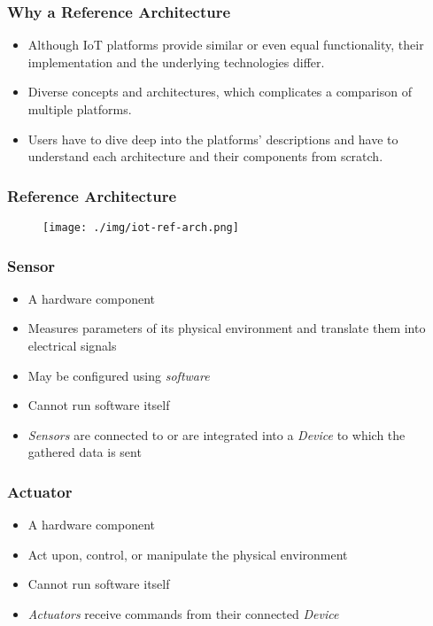 \documentclass{../iot-lecture}
\begin{document}
\begin{frame}
  \frametitle{Why a Reference Architecture}
  \begin{itemize}
    \item Although IoT platforms provide similar or even equal functionality, their implementation and the underlying technologies differ.
    \item Diverse concepts and architectures, which complicates a comparison of multiple platforms.
    \item Users have to dive deep into the platforms' descriptions and have to understand each architecture and their components from scratch.
  \end{itemize}
\end{frame}

\begin{frame}
  \frametitle{Reference Architecture}
  \begin{figure}
    \texttt{[image: ./img/iot-ref-arch.png]}
  \end{figure}
\end{frame}

\begin{frame}
  \frametitle{Sensor}
  \begin{itemize}
    \item A hardware component
    \item Measures parameters of its physical environment and translate them into electrical signals
    \item May be configured using \textit{software}
    \item Cannot run software itself
    \item \textit{\color{YellowOrange} Sensors} are connected to or are integrated into a \textit{\color{LimeGreen} Device} to which the gathered data is sent
  \end{itemize}
\end{frame}

\begin{frame}
  \frametitle{Actuator}
  \begin{itemize}
    \item A hardware component
    \item Act upon, control, or manipulate the physical environment
    \item Cannot run software itself
    \item \textit{\color{RubineRed} Actuators} receive commands from their connected \textit{\color{LimeGreen} Device}
  \end{itemize}
\end{frame}
\end{document}
